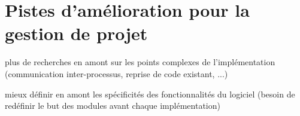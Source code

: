 \section{Pistes d'amélioration pour la gestion de projet}

plus de recherches en amont sur les points complexes de l'implémentation (communication inter-processus, reprise de code existant, ...)

mieux définir en amont les spécificités des fonctionnalités du logiciel (besoin de redéfinir le but des modules avant chaque implémentation)